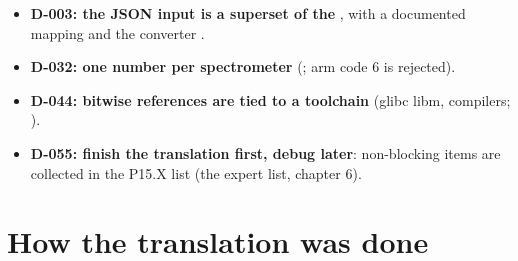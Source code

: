 \begin{itemize}
shipped input (chapter 2).
\item \textbf{D-003: the JSON input is a superset of the }, with a documented mapping and the converter .
\item \textbf{D-032: one number per spectrometer} (; arm code 6 is rejected).
\item \textbf{D-044: bitwise references are tied to a toolchain} (glibc libm, compilers; ).
\item \textbf{D-055: finish the translation first, debug later}: non-blocking items are collected in the P15.X list
(the expert list, chapter 6).
\end{itemize}
\section{\texorpdfstring{How the translation was done}{How the translation was done}}\label{translation_report-01u5fmethodology:14-how-the-translation-was-done}
